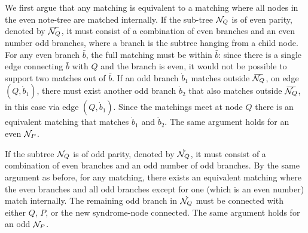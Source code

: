 We first argue that any matching is equivalent to a matching where all nodes in the even note-tree are matched internally. If the sub-tree $\mathcal{N}_Q$ is of even parity, denoted by $\overbar{\nset_Q}$, it must consist of a combination of even branches and an even number odd branches, where a branch is the subtree hanging from a child node. %
For any even branch $\bar{b}$, the full matching must be within $\bar{b}$: since there is a single edge connecting $\bar b$ with $Q$ and the branch is even, it would not be possible to support two matches out of $\bar{b}$. 
If an odd branch $\dot{b}_1$ matches outside $\overbar{\nset_Q}$, on edge $(Q, \dot{b}_1)$, there must exist another odd branch $\dot{b}_2$ that also matches outside $\overbar{\nset_Q}$, in this case via edge $(Q, \dot{b}_1)$. Since the matchings meet at node $Q$ there is an equivalent matching that matches $\dot{b}_1$ and $\dot{b}_2$. 
The same argument holds for an even $\mathcal{N}_P$.

If the subtree $\mathcal{N}_Q$ is of odd parity, denoted by $\dot{\mathcal{N}_Q}$, it must consist of a combination of even branches and an odd number of odd branches. By the same argument as before, for any matching, there exists an equivalent matching where the even branches and all odd branches except for one (which is an even number) match internally. 
The remaining odd branch in $\dot{\mathcal{N}_Q}$ must be connected with either $Q$, $P$, or the new syndrome-node connected. The same argument holds for an odd $\mathcal{N}_P$.

